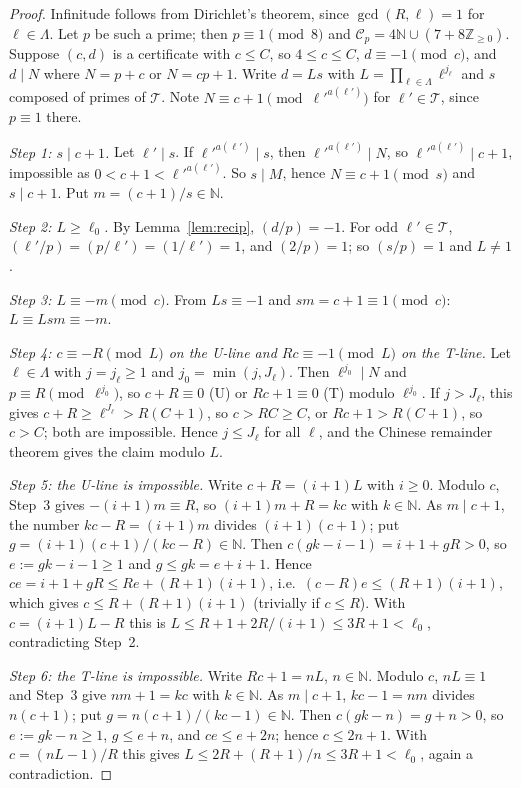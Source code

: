 \documentclass[11pt,reqno]{amsart}
\theoremstyle{definition}
\newcommand{\Z}{\mathbb Z}
\newcommand{\N}{\mathbb N}
\newcommand{\cC}{\mathcal C}
\newcommand{\cT}{\mathcal T}
\begin{document}
\begin{proof}
Infinitude follows from Dirichlet's theorem, since $\gcd(R,\ell)=1$ for
$\ell\in\Lambda$.  Let $p$ be such a prime; then $p\equiv1\pmod8$ and
$\cC_p=4\N\cup(7+8\Z_{\ge0})$.  Suppose $(c,d)$ is a certificate with
$c\le C$, so $4\le c\le C$, $d\equiv-1\pmod c$, and $d\mid N$ where $N=p+c$
or $N=cp+1$.  Write $d=Ls$ with $L=\prod_{\ell\in\Lambda}\ell^{j_\ell}$ and
$s$ composed of primes of $\cT$.  Note $N\equiv c+1\pmod{\ell'^{a(\ell')}}$
for $\ell'\in\cT$, since $p\equiv1$ there.

\emph{Step 1: $s\mid c+1$.}  Let $\ell'\mid s$.  If
$\ell'^{a(\ell')}\mid s$, then $\ell'^{a(\ell')}\mid N$, so
$\ell'^{a(\ell')}\mid c+1$, impossible as $0<c+1<\ell'^{a(\ell')}$.  So
$s\mid M$, hence $N\equiv c+1\pmod s$ and $s\mid c+1$.  Put
$m=(c+1)/s\in\N$.

\emph{Step 2: $L\ge\ell_0$.}  By Lemma~\ref{lem:recip}, $(d/p)=-1$.  For odd
$\ell'\in\cT$, $(\ell'/p)=(p/\ell')=(1/\ell')=1$, and $(2/p)=1$; so
$(s/p)=1$ and $L\ne1$.

\emph{Step 3: $L\equiv-m\pmod c$.}  From $Ls\equiv-1$ and $sm=c+1\equiv1\pmod c$:
$L\equiv Lsm\equiv-m$.

\emph{Step 4: $c\equiv-R\pmod L$ on the U-line and $Rc\equiv-1\pmod L$ on
the T-line.}  Let $\ell\in\Lambda$ with $j=j_\ell\ge1$ and
$j_0=\min(j,J_\ell)$.  Then $\ell^{j_0}\mid N$ and $p\equiv R\pmod{\ell^{j_0}}$,
so $c+R\equiv0$ (U) or $Rc+1\equiv0$ (T) modulo $\ell^{j_0}$.  If $j>J_\ell$,
this gives $c+R\ge\ell^{J_\ell}>R(C+1)$, so $c>RC\ge C$, or
$Rc+1>R(C+1)$, so $c>C$; both are impossible.  Hence $j\le J_\ell$ for all
$\ell$, and the Chinese remainder theorem gives the claim modulo $L$.

\emph{Step 5: the U-line is impossible.}  Write $c+R=(i+1)L$ with $i\ge0$.
Modulo $c$, Step~3 gives $-(i+1)m\equiv R$, so $(i+1)m+R=kc$ with $k\in\N$.
As $m\mid c+1$, the number $kc-R=(i+1)m$ divides $(i+1)(c+1)$; put
$g=(i+1)(c+1)/(kc-R)\in\N$.  Then $c(gk-i-1)=i+1+gR>0$, so
$e:=gk-i-1\ge1$ and $g\le gk=e+i+1$.  Hence
$ce=i+1+gR\le Re+(R+1)(i+1)$, i.e.\ $(c-R)e\le(R+1)(i+1)$, which gives
$c\le R+(R+1)(i+1)$ (trivially if $c\le R$).  With $c=(i+1)L-R$ this is
$L\le R+1+2R/(i+1)\le3R+1<\ell_0$, contradicting Step~2.

\emph{Step 6: the T-line is impossible.}  Write $Rc+1=nL$, $n\in\N$.
Modulo $c$, $nL\equiv1$ and Step~3 give $nm+1=kc$ with $k\in\N$.  As
$m\mid c+1$, $kc-1=nm$ divides $n(c+1)$; put $g=n(c+1)/(kc-1)\in\N$.  Then
$c(gk-n)=g+n>0$, so $e:=gk-n\ge1$, $g\le e+n$, and $ce\le e+2n$; hence
$c\le2n+1$.  With $c=(nL-1)/R$ this gives $L\le2R+(R+1)/n\le3R+1<\ell_0$,
again a contradiction.
\end{proof}
\end{document}

